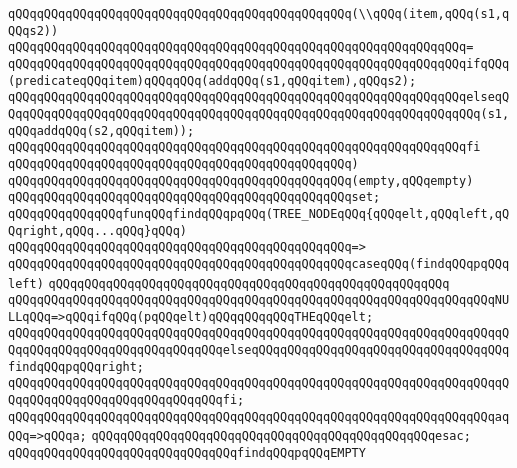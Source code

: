 \verb|qQQqqQQqqQQqqQQqqQQqqQQqqQQqqQQqqQQqqQQqqQQqqQQq(\\qQQq(item,qQQq(s1,qQQqs2))|\newline
\verb|qQQqqQQqqQQqqQQqqQQqqQQqqQQqqQQqqQQqqQQqqQQqqQQqqQQqqQQqqQQqqQQq=|\newline
\verb|qQQqqQQqqQQqqQQqqQQqqQQqqQQqqQQqqQQqqQQqqQQqqQQqqQQqqQQqqQQqqQQqifqQQq(predicateqQQqitem)qQQqqQQq(addqQQq(s1,qQQqitem),qQQqs2);|\newline
\verb|qQQqqQQqqQQqqQQqqQQqqQQqqQQqqQQqqQQqqQQqqQQqqQQqqQQqqQQqqQQqqQQqelseqQQqqQQqqQQqqQQqqQQqqQQqqQQqqQQqqQQqqQQqqQQqqQQqqQQqqQQqqQQqqQQqqQQq(s1,qQQqaddqQQq(s2,qQQqitem));|\newline
\verb|qQQqqQQqqQQqqQQqqQQqqQQqqQQqqQQqqQQqqQQqqQQqqQQqqQQqqQQqqQQqqQQqfi|\newline
\verb|qQQqqQQqqQQqqQQqqQQqqQQqqQQqqQQqqQQqqQQqqQQqqQQq)|\newline
\verb|qQQqqQQqqQQqqQQqqQQqqQQqqQQqqQQqqQQqqQQqqQQqqQQq(empty,qQQqempty)|\newline
\verb|qQQqqQQqqQQqqQQqqQQqqQQqqQQqqQQqqQQqqQQqqQQqqQQqset;|\newline
\newline
\newline
\verb|qQQqqQQqqQQqqQQqfunqQQqfindqQQqpqQQq(TREE_NODEqQQq{qQQqelt,qQQqleft,qQQqright,qQQq...qQQq}qQQq)|\newline
\verb|qQQqqQQqqQQqqQQqqQQqqQQqqQQqqQQqqQQqqQQqqQQqqQQq=>|\newline
\verb|qQQqqQQqqQQqqQQqqQQqqQQqqQQqqQQqqQQqqQQqqQQqqQQqcaseqQQq(findqQQqpqQQqleft)|\newline
\verb|qQQqqQQqqQQqqQQqqQQqqQQqqQQqqQQqqQQqqQQqqQQqqQQqqQQqqQQq|\newline
\verb|qQQqqQQqqQQqqQQqqQQqqQQqqQQqqQQqqQQqqQQqqQQqqQQqqQQqqQQqqQQqqQQqqQQqNULLqQQq=>qQQqifqQQq(pqQQqelt)qQQqqQQqqQQqTHEqQQqelt;|\newline
\verb|qQQqqQQqqQQqqQQqqQQqqQQqqQQqqQQqqQQqqQQqqQQqqQQqqQQqqQQqqQQqqQQqqQQqqQQqqQQqqQQqqQQqqQQqqQQqqQQqqQQqelseqQQqqQQqqQQqqQQqqQQqqQQqqQQqqQQqqQQqfindqQQqpqQQqright;|\newline
\verb|qQQqqQQqqQQqqQQqqQQqqQQqqQQqqQQqqQQqqQQqqQQqqQQqqQQqqQQqqQQqqQQqqQQqqQQqqQQqqQQqqQQqqQQqqQQqqQQqqQQqfi;|\newline
\verb|qQQqqQQqqQQqqQQqqQQqqQQqqQQqqQQqqQQqqQQqqQQqqQQqqQQqqQQqqQQqqQQqqQQqaqQQq=>qQQqa;|\newline
\verb|qQQqqQQqqQQqqQQqqQQqqQQqqQQqqQQqqQQqqQQqqQQqqQQqesac;|\newline
\newline
\verb|qQQqqQQqqQQqqQQqqQQqqQQqqQQqqQQqfindqQQqpqQQqEMPTY|\newline
